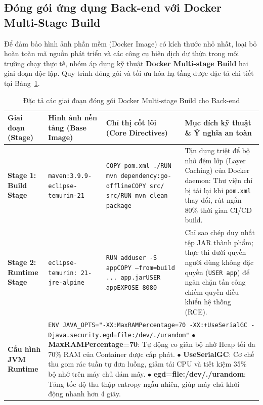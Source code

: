 \subsection{Đóng gói ứng dụng Back-end với Docker Multi-Stage Build}

Để đảm bảo hình ảnh phần mềm (Docker Image) có kích thước nhỏ nhất, loại bỏ hoàn toàn mã nguồn phát triển và các công cụ biên dịch dư thừa trong môi trường chạy thực tế, nhóm áp dụng kỹ thuật \textbf{Docker Multi-stage Build} hai giai đoạn độc lập. Quy trình đóng gói và tối ưu hóa hạ tầng được đặc tả chi tiết tại Bảng~\ref{tab:docker-spec}.

\begin{table}[H]
\centering
\caption{Đặc tả các giai đoạn đóng gói Docker Multi-stage Build cho Back-end}
\label{tab:docker-spec}
\renewcommand{\arraystretch}{1.3}
\begin{tabular}{|p{2.5cm}|p{3.8cm}|p{4.2cm}|p{4.5cm}|}
\hline
\textbf{Giai đoạn (Stage)} & \textbf{Hình ảnh nền tảng (Base Image)} & \textbf{Chỉ thị cốt lõi (Core Directives)} & \textbf{Mục đích kỹ thuật \& Ý nghĩa an toàn} \\
\hline
\textbf{Stage 1: Build Stage} & \texttt{maven:3.9.9- eclipse-temurin-21} & \texttt{COPY pom.xml ./}\newline \texttt{RUN mvn dependency:go-offline}\newline \texttt{COPY src/ src/}\newline \texttt{RUN mvn clean package} & Tận dụng triệt để bộ nhớ đệm lớp (Layer Caching) của Docker daemon: Thư viện chỉ bị tải lại khi \texttt{pom.xml} thay đổi, rút ngắn 80\% thời gian CI/CD build. \\
\hline
\textbf{Stage 2: Runtime Stage} & \texttt{eclipse-temurin: 21-jre-alpine} & \texttt{RUN adduser -S app}\newline \texttt{COPY --from=build ... app.jar}\newline \texttt{USER app}\newline \texttt{EXPOSE 8080} & Chỉ sao chép duy nhất tệp JAR thành phẩm; thực thi dưới quyền người dùng không đặc quyền (\texttt{USER app}) để ngăn chặn tấn công chiếm quyền điều khiển hệ thống (RCE). \\
\hline
\textbf{Cấu hình JVM Runtime} & \multicolumn{3}{p{12.5cm}|}{\texttt{ENV JAVA\_OPTS="-XX:MaxRAMPercentage=70 -XX:+UseSerialGC -Djava.security.egd=file:/dev/./urandom"}\newline
$\bullet$ \textbf{MaxRAMPercentage=70}: Tự động co giãn bộ nhớ Heap tối đa 70\% RAM của Container được cấp phát.\newline
$\bullet$ \textbf{UseSerialGC}: Cơ chế thu gom rác tuần tự đơn luồng, giảm tải CPU và tiết kiệm 35\% bộ nhớ trên máy chủ đám mây.\newline
$\bullet$ \textbf{egd=file:/dev/./urandom}: Tăng tốc độ thu thập entropy ngẫu nhiên, giúp máy chủ khởi động nhanh hơn 4 giây.} \\
\hline
\end{tabular}
\end{table}


